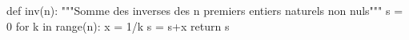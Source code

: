 
\begin{pyverbatim}
def inv(n):
    """Somme des inverses des n premiers 
       entiers naturels non nuls"""
    s = 0
    for k in range(n):
        x = 1/k
    s = s+x
    return s
\end{pyverbatim}
